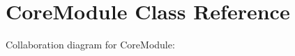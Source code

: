 \hypertarget{class_core_module}{}\section{Core\+Module Class Reference}
\label{class_core_module}


Collaboration diagram for Core\+Module\+:
